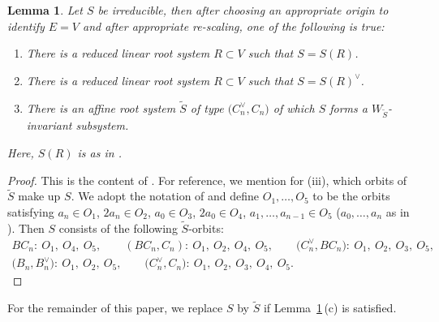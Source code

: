 \documentclass[pdftex]{sigma}
\newtheorem{Lemma}[Theorem]{Lemma}
\theoremstyle{definition}
\numberwithin{equation}{section}
\begin{document}
\begin{Lemma}\label{sec:lem-all-affine-root-systems}
 Let $S$ be irreducible, then after choosing an appropriate origin to identify $E=V$ and after appropriate re-scaling,
 one of the following is true:
 \begin{enumerate}\itemsep=0pt
 \item[$(i)$] There is a reduced linear root system $R\subset V$ such that $S=S(R)$.
 \item[$(ii)$] There is a reduced linear root system $R\subset V$ such that $S=S(R)^\vee$.
 \item[$(iii)$] There is an affine root system $\tilde{S}$ of type $\bigl(C_n^\vee, C_n\bigr)$ of which $S$ forms
 a $W_{\tilde{S}}$-invariant subsystem.
 \end{enumerate}
 Here, $S(R)$ is as in {\rm \cite[Section~1.2.1]{macdonald}}.
\end{Lemma}
\begin{proof}
 This is the content of \cite[Section~1.3]{macdonald}.
 For reference, we mention for (iii), which orbits of $\tilde{S}$ make up
 $S$.
 We adopt the notation of \cite[Section~1.3]{macdonald}
 and define $O_1,\dots,O_5$ to be the orbits satisfying
$
 a_n\in O_1$, $ 2a_n\in O_2$, $ a_0\in O_3$, $ 2a_0\in O_4$, $ a_1,\dots,a_{n-1}\in O_5$
 ($a_0,\dots,a_n$ as in \cite[Section~1.3.18]{macdonald}).
 Then $S$ consists of the following
 $\tilde{S}$-orbits:
 \begin{gather*}
 BC_n\colon\ O_1,\ O_4,\ O_5,\qquad
 (BC_n, C_n)\colon\ O_1,\ O_2,\ O_4,\ O_5,\qquad
 \bigl(C_n^\vee, BC_n\bigr)\colon\ O_1,\ O_2,\ O_3,\ O_5,\\
 \bigl(B_n, B_n^\vee\bigr)\colon\ O_1,\ O_2,\ O_5,\qquad
 \bigl(C_n^\vee, C_n\bigr)\colon\ O_1,\ O_2,\ O_3,\ O_4,\ O_5.\tag*{\qed}
 \end{gather*} \renewcommand{\qed}{}
\end{proof}

For the remainder of this paper, we replace $S$ by $\tilde{S}$ if Lemma~\ref{sec:lem-all-affine-root-systems}\,(c) is satisfied.
\end{document}
